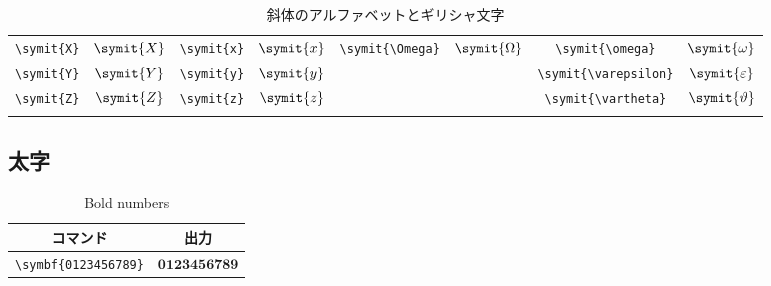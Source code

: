 \begin{longtable}{cccccccc}
    \verb|\symit{X}| & \(\symit{X}\) & \verb|\symit{x}| & \(\symit{x}\) & \verb|\symit{\Omega}|   & \(\symit{\Omega}\)   & \verb|\symit{\omega}|      & \(\symit{\omega}\)      \\
    \verb|\symit{Y}| & \(\symit{Y}\) & \verb|\symit{y}| & \(\symit{y}\) &                         &                      & \verb|\symit{\varepsilon}| & \(\symit{\varepsilon}\) \\
    \verb|\symit{Z}| & \(\symit{Z}\) & \verb|\symit{z}| & \(\symit{z}\) &                         &                      & \verb|\symit{\vartheta}|   & \(\symit{\vartheta}\)   \\
    \bottomrule
    \caption{斜体のアルファベットとギリシャ文字}
    \label{tab:italic_letters}
\end{longtable}

\subsection{太字}

\begin{table}[H]
    \centering
    \begin{tabular}{cc}
        \toprule
        コマンド                  & 出力                   \\
        \midrule
        \verb|\symbf{0123456789}| & \(\symbf{0123456789}\) \\
        \bottomrule
    \end{tabular}
    \caption{Bold numbers}
    \label{tab:bold_numbers}
\end{table}

